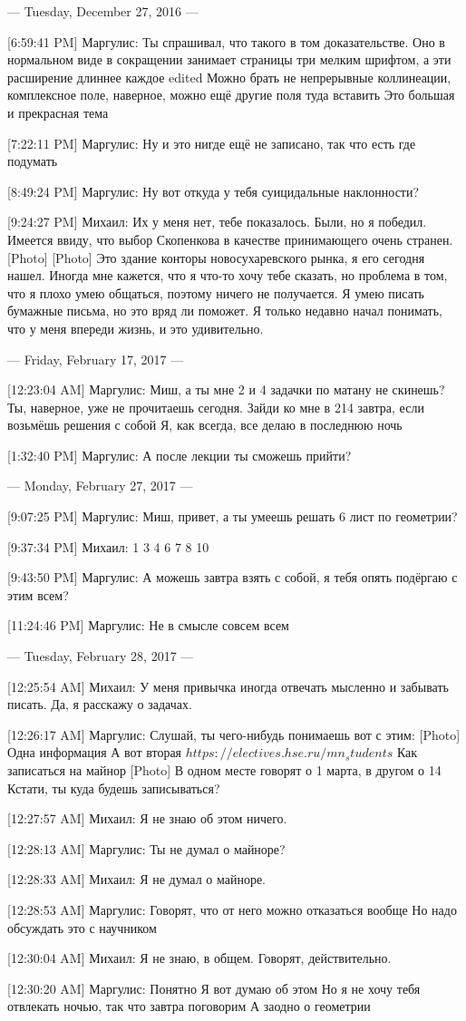 \documentclass{article}
\begin{document}
--- Tuesday, December 27, 2016 ---

[6:59:41 PM] Маргулис:
Ты спрашивал, что такого в том доказательстве. Оно в нормальном виде в сокращении занимает страницы три мелким шрифтом, а эти расширение длиннее каждое
edited 
Можно брать не непрерывные коллинеации, комплексное поле, наверное, можно ещё другие поля туда вставить
 Это большая и прекрасная тема

[7:22:11 PM] Маргулис:
Ну и это нигде ещё не записано, так что есть где подумать

[8:49:24 PM] Маргулис:
Ну вот откуда у тебя суицидальные наклонности?

[9:24:27 PM] Михаил:
Их у меня нет, тебе показалось. Были, но я победил. Имеется ввиду, что выбор Скопенкова в качестве принимающего очень странен.
 [Photo]
 [Photo]
 Это здание конторы новосухаревского рынка, я его сегодня нашел.
 Иногда мне кажется, что я что-то хочу тебе сказать, но проблема в том, что я плохо умею общаться, поэтому ничего не получается.
 Я умею писать бумажные письма, но это вряд ли поможет.
 Я только недавно начал понимать, что у меня впереди жизнь, и это удивительно.

--- Friday, February 17, 2017 ---

[12:23:04 AM] Маргулис:
Миш, а ты мне 2 и 4 задачки по матану не скинешь?
 Ты, наверное, уже не прочитаешь сегодня. Зайди ко мне в 214 завтра, если возьмёшь решения с собой
 Я, как всегда, все делаю в последнюю ночь

[1:32:40 PM] Маргулис:
А после лекции ты сможешь прийти?

--- Monday, February 27, 2017 ---

[9:07:25 PM] Маргулис:
Миш, привет, а ты умеешь решать 6 лист по геометрии?

[9:37:34 PM] Михаил:
1 3 4 6 7 8 10

[9:43:50 PM] Маргулис:
А можешь завтра взять с собой, я тебя опять подёргаю с этим всем?

[11:24:46 PM] Маргулис:
Не в смысле совсем всем

--- Tuesday, February 28, 2017 ---

[12:25:54 AM] Михаил:
У меня привычка иногда отвечать мысленно и забывать писать. Да, я расскажу о задачах.

[12:26:17 AM] Маргулис:
Слушай, ты чего-нибудь понимаешь вот с этим:
 [Photo]
 Одна информация
 А вот вторая
 $https://electives.hse.ru/mn_students$
Как записаться на майнор
[Photo]
 В одном месте говорят о 1 марта, в другом о 14
 Кстати, ты куда будешь записываться?

[12:27:57 AM] Михаил:
Я не знаю об этом ничего.

[12:28:13 AM] Маргулис:
Ты не думал о майноре?

[12:28:33 AM] Михаил:
Я не думал о майноре.

[12:28:53 AM] Маргулис:
Говорят, что от него можно отказаться вообще
 Но надо обсуждать это с научником

[12:30:04 AM] Михаил:
Я не знаю, в общем.
 Говорят, действительно.

[12:30:20 AM] Маргулис:
Понятно
 Я вот думаю об этом
 Но я не хочу тебя отвлекать ночью, так что завтра поговорим 
А заодно о геометрии
\end{document}
